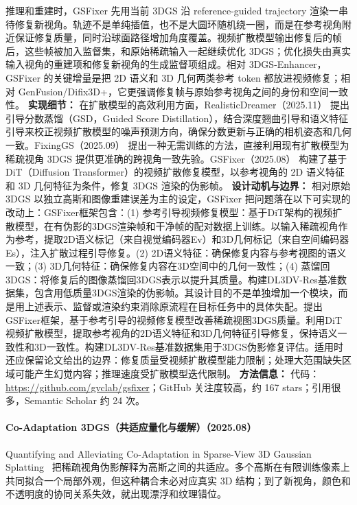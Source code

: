 推理和重建时，GSFixer 先用当前 3DGS 沿 reference-guided trajectory 渲染一串待修复新视角。轨迹不是单纯插值，也不是大圆环随机绕一圈，而是在参考视角附近保证修复质量，同时沿球面路径增加角度覆盖。视频扩散模型输出修复后的帧后，这些帧被加入监督集，和原始稀疏输入一起继续优化 3DGS；优化损失由真实输入视角的重建项和修复新视角的生成监督项组成。相对 3DGS-Enhancer，GSFixer 的关键增量是把 2D 语义和 3D 几何两类参考 token 都放进视频修复；相对 GenFusion/Difix3D+，它更强调修复帧与原始参考视角之间的身份和空间一致性。
\textbf{实现细节：} 在扩散模型的高效利用方面，RealisticDreamer（2025.11） 提出引导分数蒸馏（GSD，Guided Score Distillation），结合深度翘曲引导和语义特征引导来校正视频扩散模型的噪声预测方向，确保分数更新与正确的相机姿态和几何一致。FixingGS（2025.09） 提出一种无需训练的方法，直接利用现有扩散模型为稀疏视角 3DGS 提供更准确的跨视角一致先验。GSFixer（2025.08） 构建了基于 DiT（Diffusion Transformer）的视频扩散修复模型，以参考视角的 2D 语义特征和 3D 几何特征为条件，修复 3DGS 渲染的伪影帧。
\textbf{设计动机与边界：} 相对原始 3DGS 以独立高斯和图像重建误差为主的设定，GSFixer 把问题落在以下可实现的改动上：GSFixer框架包含：(1) 参考引导视频修复模型：基于DiT架构的视频扩散模型，在有伪影的3DGS渲染帧和干净帧的配对数据上训练。以输入稀疏视角作为参考，提取2D语义标记（来自视觉编码器Ev）和3D几何标记（来自空间编码器Es），注入扩散过程引导修复。(2) 2D语义特征：确保修复内容与参考视图的语义一致；(3) 3D几何特征：确保修复内容在3D空间中的几何一致性；(4) 蒸馏回3DGS：将修复后的图像蒸馏回3DGS表示以提升其质量。构建DL3DV-Res基准数据集，包含用低质量3DGS渲染的伪影帧。其设计目的不是单独增加一个模块，而是用上述表示、监督或渲染约束消除原流程在目标任务中的具体失配。提出GSFixer框架，基于参考引导的视频修复模型改善稀疏视图3DGS质量。利用DiT视频扩散模型，提取参考视角的2D语义特征和3D几何特征引导修复，保持语义一致性和3D一致性。构建DL3DV-Res基准数据集用于3DGS伪影修复评估。适用时还应保留论文给出的边界：修复质量受视频扩散模型能力限制；处理大范围缺失区域可能产生幻觉内容；推理速度受扩散模型迭代限制。
\textbf{方法信息：} 代码：\url{https://github.com/gvclab/gsfixer}；GitHub 关注度较高，约 167 stars；引用很多，Semantic Scholar 约 24 次。



\paragraph{Co-Adaptation 3DGS（共适应量化与缓解）（2025.08）}
Quantifying and Alleviating Co-Adaptation in Sparse-View 3D Gaussian Splatting~\cite{2508_12720} 把稀疏视角伪影解释为高斯之间的共适应。多个高斯在有限训练像素上共同拟合一个局部外观，但这种耦合未必对应真实 3D 结构；到了新视角，颜色和不透明度的协同关系失效，就出现漂浮和纹理错位。

